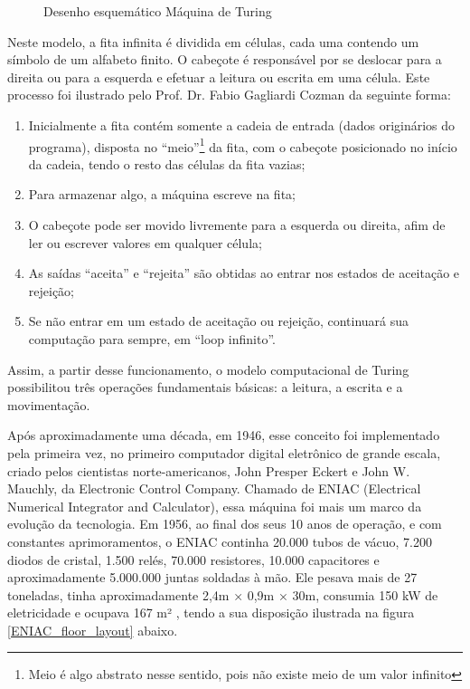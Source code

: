 \vspace{1cm}
\begin{figure}[H] \centering 
  \caption{\label{turing_machine} Desenho esquemático Máquina de Turing} 
\end{figure}

Neste modelo, a fita infinita é dividida em células, cada uma contendo um símbolo de um alfabeto finito. O cabeçote é responsável por se deslocar para a direita ou para a esquerda e efetuar a leitura ou escrita em uma célula. Este processo foi ilustrado pelo Prof. Dr. Fabio Gagliardi Cozman \cite{7} da seguinte forma:

\begin{enumerate}
  \item Inicialmente a fita contém somente a cadeia de entrada (dados originários do programa), disposta no ``meio''\footnote{Meio é algo abstrato nesse sentido, pois não existe meio de um valor infinito} da fita, com o cabeçote posicionado no início da cadeia, tendo o resto das células da fita vazias;
  \item Para armazenar algo, a máquina escreve na fita;
  \item O cabeçote pode ser movido livremente para a esquerda ou direita, afim de ler ou escrever valores em qualquer célula;
  \item As saídas ``aceita'' e ``rejeita'' são obtidas ao entrar nos estados de aceitação e rejeição;
  \item Se não entrar em um estado de aceitação ou rejeição, continuará sua computação para sempre, em ``loop infinito''.
\end{enumerate}

Assim, a partir desse funcionamento, o modelo computacional de Turing possibilitou três operações fundamentais básicas: a leitura, a escrita e a movimentação.   

Após aproximadamente uma década, em 1946, esse conceito foi implementado pela primeira vez, no primeiro computador digital eletrônico de grande escala, criado pelos cientistas norte-americanos, John Presper Eckert e John W. Mauchly, da Electronic Control Company. Chamado de ENIAC (Electrical Numerical Integrator and Calculator), essa máquina foi mais um marco da evolução da tecnologia. Em 1956, ao final dos seus 10 anos de operação, e com constantes aprimoramentos, o ENIAC continha 20.000 tubos de vácuo, 7.200 diodos de cristal, 1.500 relés, 70.000 resistores, 10.000 capacitores e aproximadamente 5.000.000 juntas soldadas à mão. Ele pesava mais de 27 toneladas, tinha aproximadamente 2,4m × 0,9m × 30m, consumia 150 kW de eletricidade e ocupava 167 m² \cite{2}, tendo a sua disposição ilustrada na figura \ref{ENIAC_floor_layout} abaixo. 

